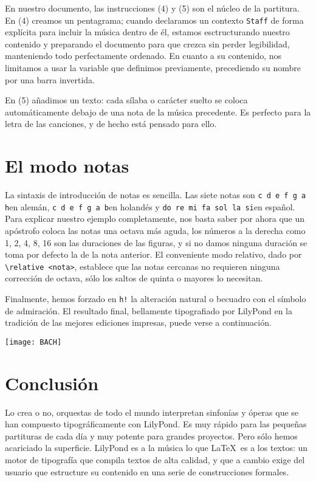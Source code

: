 \documentclass[a4paper,10pt,oneside,headinclude,titlepage]{article} %
\begin{document}
En nuestro documento, las instrucciones (4) y (5) son el núcleo de la
partitura. En (4) creamos un pentagrama; cuando declaramos un contexto
\verb+Staff+ de forma explícita para incluir la música dentro de él,
estamos esctructurando nuestro contenido y preparando el documento
para que crezca sin perder legibilidad, manteniendo todo perfectamente
ordenado. En cuanto a su contenido, nos limitamos a usar la variable
que definimos previamente, precediendo su nombre por una barra
invertida.

En (5) añadimos un texto: cada sílaba o carácter suelto se coloca
automáticamente debajo de una nota de la música precedente. Es
perfecto para la letra de las canciones, y de hecho está pensado para
ello.

\section{El modo notas}

La sintaxis de introducción de notas es sencilla. Las siete notas son
\quad\verb+c d e f g a h+\quad en alemán,
\quad\verb+c d e f g a b+\quad en holandés y
\quad\verb+do re mi fa sol la si+\quad en español. Para explicar
nuestro ejemplo completamente, nos basta saber por ahora que un
apóstrofo coloca las notas una octava más aguda, los números a la
derecha como 1, 2, 4, 8, 16 son las duraciones de las figuras, y si no
damos ninguna duración se toma por defecto la de la nota anterior. El
conveniente modo relativo, dado por \verb+\relative <nota>+, establece
que las notas cercanas no requieren ninguna corrección de octava, sólo
los saltos de quinta o mayores lo necesitan.

Finalmente, hemos forzado en \verb+h!+ la alteración natural o
becuadro con el símbolo de admiración. El resultado final, bellamente
tipografiado por LilyPond en la tradición de las mejores ediciones
impresas, puede verse a continuación.

\texttt{[image: BACH]}

\section{Conclusión}
Lo crea o no, orquestas de todo el mundo interpretan sinfonías y
óperas que se han compuesto tipográficamente con LilyPond. Es muy
rápido para las pequeñas partituras de cada día y muy potente para
grandes proyectos. Pero sólo hemos acariciado la superficie. LilyPond
es a la música lo que \LaTeX\ es a los textos: un motor de tipografía
que compila textos de alta calidad, y que a cambio exige del usuario
que estructure su contenido en una serie de construcciones formales.
\end{document}
